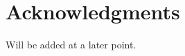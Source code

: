 \documentclass{article}
\begin{document}







\section*{Acknowledgments}

Will be added at a later point.







\small 


\end{document}
